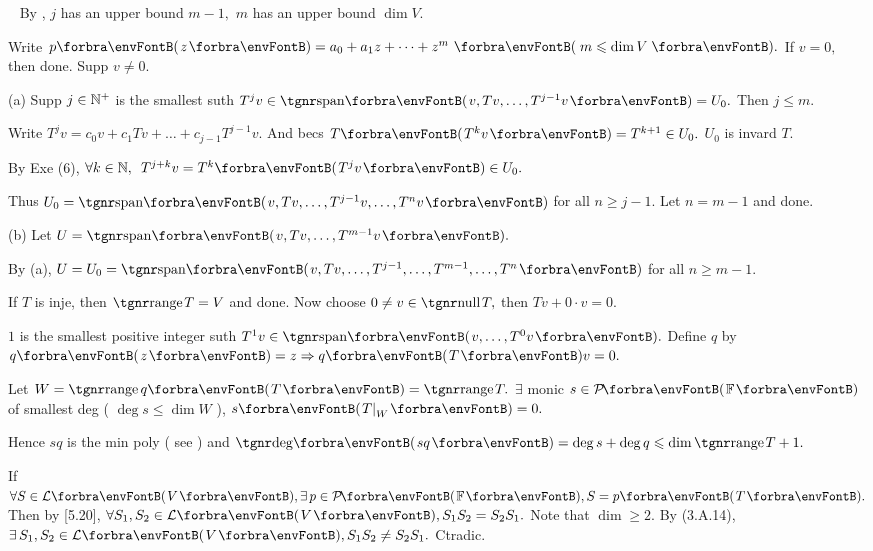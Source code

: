 \par\quad
\Comment\,\,\, By \NOTEFOR [8.40], $j$ has an upper bound $m-1,$ $m$ has an upper bound $\dim V.$\par\quad
Write $p\Par{z}=a_0 +a_1 z+\dots+z^m \,\,\Par{\,m\leqslant \dim V\,}.$ If $v=0,$ then done. Supp $v\neq 0.$\par\quad
(a) Supp $j\in{\mathbb{N}^+}$ is the smallest suth $T^j v\in\Span{v,Tv,\dots,T^{j-1}v}=U_0.$ Then $j\leqslant m.$\par\quad\Ha
Write $T^j v=c_0 v+c_1 Tv+\dots+c_{j-1}T^{j-1}v.$ And becs $T\Par{T^k v}=T^{k+1}\in U_0.$ $U_0$ is invard $T.$\par\quad\Ha
By Exe (6), $\forall k\in\Nbb,\,\,\,T^{j+k}v=T^k\Par{T^j v}\in U_0.$\par\quad\Ha
Thus $U_0=\Span{v,Tv,\dots,T^{j-1} v,\dots,T^n v}$ for all $n\geqslant j-1.$ Let $n=m-1$ and done.\par\quad
(b) Let $U=\Span{v,Tv,\dots,T^{m-1}v}.$\par\quad\Hb
By (a), $U=U_0=\Span{v,Tv,\dots,T^{j-1},\dots,T^{m-1},\dots,T^n}$ for all $n\geqslant m-1.$\PfEnd
\SepLine

\par\quad
If $T$ is inje, then $\range T=V$ and done. Now choose $0\neq v\in\null T,$ then $Tv+0\cdot v=0.$\par\quad
$1$ is the smallest positive integer suth $T^1 v\in\Span{v,\dots,T^0 v}.$ Define $q$ by $q\Par{z}=z\Rightarrow q\Par{T}v=0.$\par\quad
Let $W=\rangep q\Par{T}=\range T.$ $\exists$ monic $s\in\PoFi$ of smallest deg ( $\deg s\leqslant\dim W$ ), $s\Par{T\mmid_W}=0.$\par\quad
Hence $sq$ is the min poly ( see \NOTEFOR [8.40] ) and $\Deg\Par{sq}=\deg s+\deg q\leqslant\dim\range T+1.$\PfEnd
\SepLine

If $\forall S\in\Lm{V},\exists\,p\in\PoFi,S=p\Par{T}.$ Then by [5.20], $\forall S_1,S_2\in\Lm{V},S_1S_2=S_2S_1.$\parSol{}
Note that $\dim\geqslant 2.$ By (3.A.14), $\exists\,S_1,S_2\in\Lm{V},S_1S_2\neq S_2S_1.$ Ctradic.\PfEnd
\SepLine

